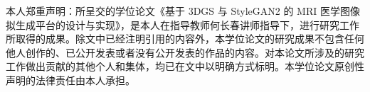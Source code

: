 \thispagestyle{thesis-decl}


\vspace{0.4em}

\begin{thesisdeclbody}
本人郑重声明：所呈交的学位论文《基于 3DGS 与 StyleGAN2 的 MRI 医学图像拟生成平台的设计与实现》，是本人在指导教师何长春讲师指导下，进行研究工作所取得的成果。除文中已经注明引用的内容外，本学位论文的研究成果不包含任何他人创作的、已公开发表或者没有公开发表的作品的内容。对本论文所涉及的研究工作做出贡献的其他个人和集体，均已在文中以明确方式标明。本学位论文原创性声明的法律责任由本人承担。
\end{thesisdeclbody}

\vspace{0.25em}

